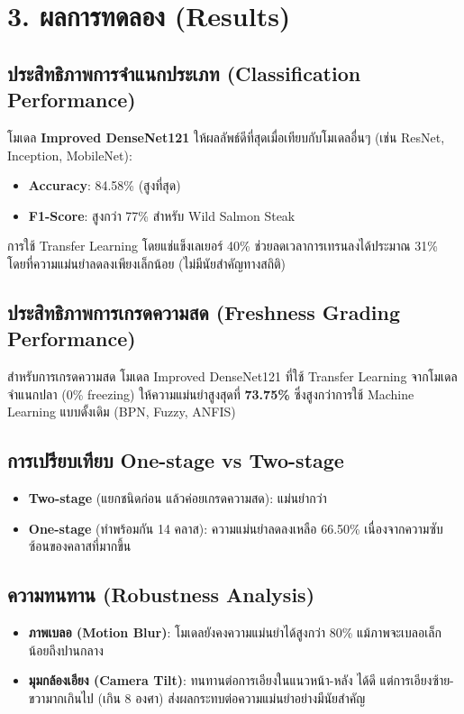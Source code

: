 \documentclass[a4paper,12pt]{article}
\begin{document}
\section{3. ผลการทดลอง (Results)}

\subsection{ประสิทธิภาพการจำแนกประเภท (Classification Performance)}
โมเดล \textbf{Improved DenseNet121} ให้ผลลัพธ์ดีที่สุดเมื่อเทียบกับโมเดลอื่นๆ (เช่น ResNet, Inception, MobileNet):
\begin{itemize}
    \item \textbf{Accuracy}: 84.58\% (สูงที่สุด)
    \item \textbf{F1-Score}: สูงกว่า 77\% สำหรับ Wild Salmon Steak
\end{itemize}
การใช้ Transfer Learning โดยแช่แข็งเลเยอร์ 40\% ช่วยลดเวลาการเทรนลงได้ประมาณ 31\% โดยที่ความแม่นยำลดลงเพียงเล็กน้อย (ไม่มีนัยสำคัญทางสถิติ)

\subsection{ประสิทธิภาพการเกรดความสด (Freshness Grading Performance)}
สำหรับการเกรดความสด โมเดล Improved DenseNet121 ที่ใช้ Transfer Learning จากโมเดลจำแนกปลา (0\% freezing) ให้ความแม่นยำสูงสุดที่ \textbf{73.75\%} ซึ่งสูงกว่าการใช้ Machine Learning แบบดั้งเดิม (BPN, Fuzzy, ANFIS)

\subsection{การเปรียบเทียบ One-stage vs Two-stage}
\begin{itemize}
    \item \textbf{Two-stage} (แยกชนิดก่อน แล้วค่อยเกรดความสด): แม่นยำกว่า
    \item \textbf{One-stage} (ทำพร้อมกัน 14 คลาส): ความแม่นยำลดลงเหลือ 66.50\% เนื่องจากความซับซ้อนของคลาสที่มากขึ้น
\end{itemize}

\subsection{ความทนทาน (Robustness Analysis)}
\begin{itemize}
    \item \textbf{ภาพเบลอ (Motion Blur)}: โมเดลยังคงความแม่นยำได้สูงกว่า 80\% แม้ภาพจะเบลอเล็กน้อยถึงปานกลาง
    \item \textbf{มุมกล้องเอียง (Camera Tilt)}: ทนทานต่อการเอียงในแนวหน้า-หลัง ได้ดี แต่การเอียงซ้าย-ขวามากเกินไป (เกิน 8 องศา) ส่งผลกระทบต่อความแม่นยำอย่างมีนัยสำคัญ
\end{itemize}
\end{document}
